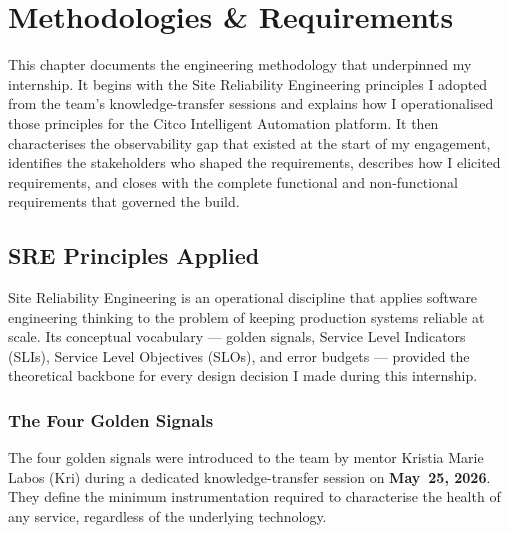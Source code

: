 
\chapter{Methodologies \& Requirements}
\label{chap:methodologies}

This chapter documents the engineering methodology that underpinned my
internship. It begins with the Site Reliability Engineering principles
I adopted from the team's knowledge-transfer sessions and explains how
I operationalised those principles for the Citco Intelligent
Automation platform. It then characterises the observability gap that
existed at the start of my engagement, identifies the stakeholders who
shaped the requirements, describes how I elicited requirements, and
closes with the complete functional and non-functional requirements that
governed the build.

\section{SRE Principles Applied}
\label{sec:sre_principles}

Site Reliability Engineering is an operational discipline that applies
software engineering thinking to the problem of keeping production
systems reliable at scale. Its conceptual vocabulary --- golden signals,
Service Level Indicators (SLIs), Service Level Objectives (SLOs), and
error budgets --- provided the theoretical backbone for every design
decision I made during this internship.

\subsection{The Four Golden Signals}

The four golden signals were introduced to the team by mentor Kristia
Marie Labos (Kri) during a dedicated knowledge-transfer session on
\textbf{May~25, 2026}. They define the minimum instrumentation required
to characterise the health of any service, regardless of the underlying
technology.

